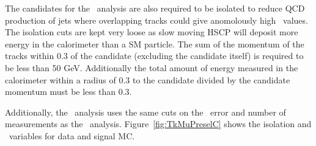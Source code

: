 The candidates for the \tktof\ analysis are also required to be isolated to reduce QCD production of jets where overlapping tracks could give
anomolously high \dedx\ values. The isolation cuts are kept very loose as slow moving HSCP will deposit more energy in the calorimeter than a SM particle.
The sum of the momentum of the tracks within 0.3 of the candidate (excluding the candidate itself) is required to be less than 50 GeV. Additionally the total
amount of energy measured in the calorimeter within a radius of 0.3 to the candidate divided by the candidate momentum must be less than 0.3.

Additionally, the \tktof\ analysis uses the same cuts on the \invbeta\ error and number of measurements as the \muononly\ analysis.
Figure~\ref{fig:TkMuPreselC} shows the isolation and \invbeta\ variables for data and signal MC.

